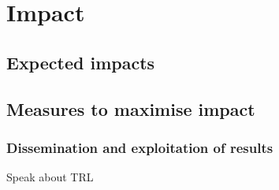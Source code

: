\chapter{Impact}\label{chap:impact}

\section{Expected impacts}\label{sec:expected-impact}

  
  
  
  





\section{Measures to maximise impact}

\subsection{Dissemination and exploitation of results}

{\color{red} Speak about TRL}

